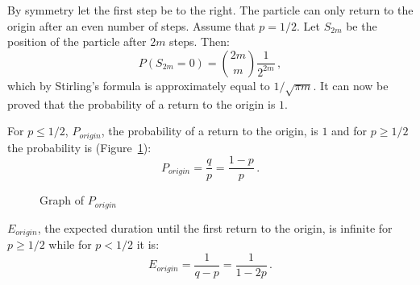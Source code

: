 \documentclass[11pt,a4paper]{article}
\newcommand*{\disfrac}[2]{\displaystyle\frac{#1}{#2}}
\newcommand*{\dischoose}[2]{\displaystyle{#1 \choose #2}}
\begin{document}
By symmetry let the first step be to the right. The particle can only return to the origin after an even number of steps. Assume that $p=1/2$. Let $S_{2m}$ be the position of the particle after $2m$ steps. Then:
\[
P(S_{2m}=0) = \dischoose{2m}{m}\disfrac{1}{2^{2m}}\,,
\]
which by Stirling's formula is approximately equal to $1/\sqrt{\pi m}$. It can now be proved that the probability of a return to the origin is $1$.

For $p\leq 1/2$, $P_{\mathit{origin}}$, the probability of a return to the origin, is $1$ and for $p\geq 1/2$ the probability is (Figure~\ref{f.walk1}):
\[
P_{\mathit{origin}} = \disfrac{q}{p}=\disfrac{1-p}{p}\,.
\]
\begin{figure}
\begin{center}
\caption{Graph of $P_{\mathit{origin}}$}\label{f.walk1}
\end{center}
\end{figure}

$E_{\mathit{origin}}$, the expected duration until the first return to the origin, is infinite for $p\geq 1/2$ while for $p<1/2$ it is:
\[
E_{\mathit{origin}}=\disfrac{1}{q-p}=\disfrac{1}{1-2p}\,.
\]
\end{document}
